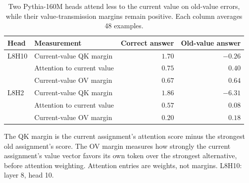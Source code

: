 \begin{table}[htbp]
\centering
\small
\setlength{\tabcolsep}{6pt}
\caption{Two Pythia-160M heads attend less to the current value on old-value
errors, while their value-transmission margins remain positive.
Each column averages 48 examples.}
\label{tab:stage-n-circuit}
\begin{tabularx}{\textwidth}{@{}lXrr@{}}
\toprule
Head & Measurement & Correct answer & Old-value answer \\
\midrule
L8H10 & Current-value QK margin & $1.70$ & $-0.26$ \\
      & Attention to current value & $0.75$ & $0.40$ \\
      & Current-value OV margin & $0.67$ & $0.64$ \\
\addlinespace
L8H2  & Current-value QK margin & $1.86$ & $-6.31$ \\
      & Attention to current value & $0.57$ & $0.08$ \\
      & Current-value OV margin & $0.20$ & $0.18$ \\
\bottomrule
\end{tabularx}
\vspace{3pt}\parbox{\linewidth}{\footnotesize
The QK margin is the current assignment's attention score minus the strongest
old assignment's score. The OV margin measures how strongly the current
assignment's value vector favors its own token over the strongest alternative,
before attention weighting. Attention entries are weights, not margins.
L8H10: layer 8, head 10.}
\end{table}
